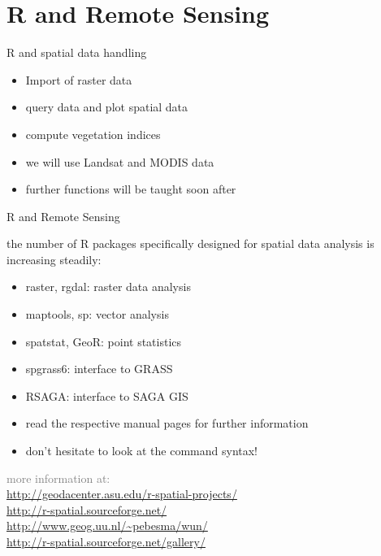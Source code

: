 \section{R and Remote Sensing}


\begin{frame}{R and spatial data handling}

      \begin{itemize}
	\item Import of raster data
	\item query data and plot spatial data
	\item compute vegetation indices
	\item we will use Landsat and MODIS data
	\item further functions will be taught soon after
      \end{itemize}

\end{frame}


\begin{frame}{R and Remote Sensing}
 
    the number of R packages specifically designed for spatial data analysis is increasing steadily:

	  \begin{itemize}
	    \item raster, rgdal: raster data analysis
	    \item maptools, sp: vector analysis
	    \item spatstat, GeoR: point statistics  
	    \item spgrass6: interface to GRASS
	    \item RSAGA: interface to SAGA GIS
	    \item read the respective manual pages for further information
	    \item don't hesitate to look at the command syntax!
	  \end{itemize}

    \vspace{1cm}

	  \textcolor{gray}{
	  \begin{tiny}
	  \hspace{5cm}more information at:\\ 
	  \hspace{5cm} \url{http://geodacenter.asu.edu/r-spatial-projects/}\\ 
	  \hspace{5cm} \url{http://r-spatial.sourceforge.net/}\\
	  \hspace{5cm} \url{http://www.geog.uu.nl/~pebesma/wun/}\\
	  \hspace{5cm} \url{http://r-spatial.sourceforge.net/gallery/}\\
	  \end{tiny}
	  }


\end{frame}





